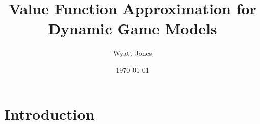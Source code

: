 \documentclass[12pt]{article}
\title{Value Function Approximation for Dynamic Game Models}
\author{Wyatt Jones}
\date{\today}
\begin{document}
\maketitle


\section{Introduction}



\end{document}
